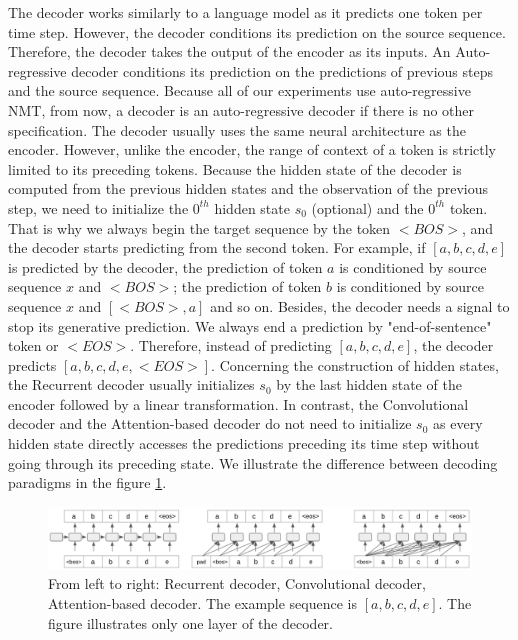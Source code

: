 The decoder works similarly to a language model as it predicts one token per time step. However, the decoder conditions its prediction on the source sequence. Therefore, the decoder takes the output of the encoder as its inputs. An Auto-regressive decoder conditions its prediction on the predictions of previous steps and the source sequence. Because all of our experiments use auto-regressive NMT, from now, a decoder is an auto-regressive decoder if there is no other specification. The decoder usually uses the same neural architecture as the encoder. However, unlike the encoder, the range of context of a token is strictly limited to its preceding tokens. Because the hidden state of the decoder is computed from the previous hidden states and the observation of the previous step, we need to initialize the $0^{th}$ hidden state $s_0$ (optional) and the $0^{th}$ token. That is why we always begin the target sequence by the token $<BOS>$, and the decoder starts predicting from the second token. For example, if $[a,b,c,d,e]$ is predicted by the decoder, the prediction of token $a$ is conditioned by source sequence $x$ and $<BOS>$; the prediction of token $b$ is conditioned by source sequence $x$ and $[<BOS>,a]$ and so on. Besides, the decoder needs a signal to stop its generative prediction. We always end a prediction by "end-of-sentence" token or $<EOS>$. Therefore, instead of predicting $[a,b,c,d,e]$, the decoder predicts $[a,b,c,d,e, <EOS>]$. Concerning the construction of hidden states, the Recurrent decoder usually initializes $s_0$ by the last hidden state of the encoder followed by a linear transformation. In contrast, the Convolutional decoder and the Attention-based decoder do not need to initialize $s_0$ as every hidden state directly accesses the predictions preceding its time step without going through its preceding state. We illustrate the difference between decoding paradigms in the figure \ref{fig:decoding}.

\begin{figure}[htbp]
\includegraphics[width=\textwidth]{graphics/decoding.png}
\caption[Illustration of 3 most popular auto-regressive decoding paradigms]{From left to right: Recurrent decoder, Convolutional decoder, Attention-based decoder. The example sequence is $[a,b,c,d,e]$. The figure illustrates only one layer of the decoder.}
\label{fig:decoding}
\end{figure}

